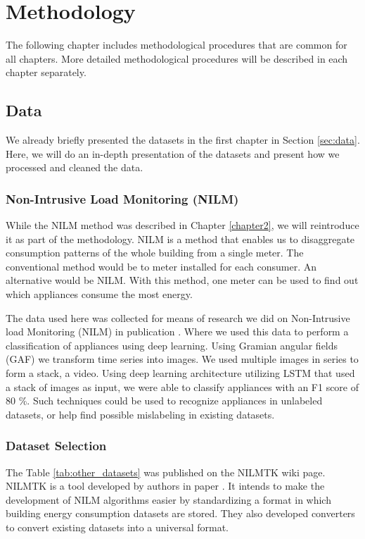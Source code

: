 
\chapter{Methodology} %
\label{chapter3} 

The following chapter includes methodological procedures that are common for all chapters.
More detailed methodological procedures will be described in each chapter separately. 

\section{Data}
\label{ssec:data}
We already briefly presented the datasets in the first chapter in Section \ref{sec:data}.
Here, we will do an in-depth presentation of the datasets and present how we processed and cleaned the data. 

\subsection{Non-Intrusive Load Monitoring (NILM)}

While the NILM method was described in Chapter \ref{chapter2}, we will reintroduce it as part of the methodology.
NILM is a method that enables us to disaggregate consumption patterns of the whole building from a single meter.
The conventional method would be to meter installed for each consumer.
An alternative would be NILM. With this method, one meter can be used to find out which appliances consume the most energy.

The data used here was collected for means of research we did on Non-Intrusive load Monitoring (NILM) in publication \cite{Jenko2022}.
Where we used this data to perform a classification of appliances using deep learning.
Using Gramian angular fields (GAF) we transform time series into images.
We used multiple images in series to form a stack, a video.
Using deep learning architecture utilizing LSTM that used a stack of images as input, we were able to classify appliances with an F1 score of 80 \%.
Such techniques could be used to recognize appliances in unlabeled datasets, or help find possible mislabeling in existing datasets.

\subsection{Dataset Selection}

The Table \ref{tab:other_datasets} was published on the NILMTK \cite{nilmtk} wiki page. 
NILMTK is a tool developed by authors in paper \cite{nilmtk}.
It intends to make the development of NILM algorithms easier by standardizing a format in which building energy consumption datasets are stored. 
They also developed converters to convert existing datasets into a universal format.

